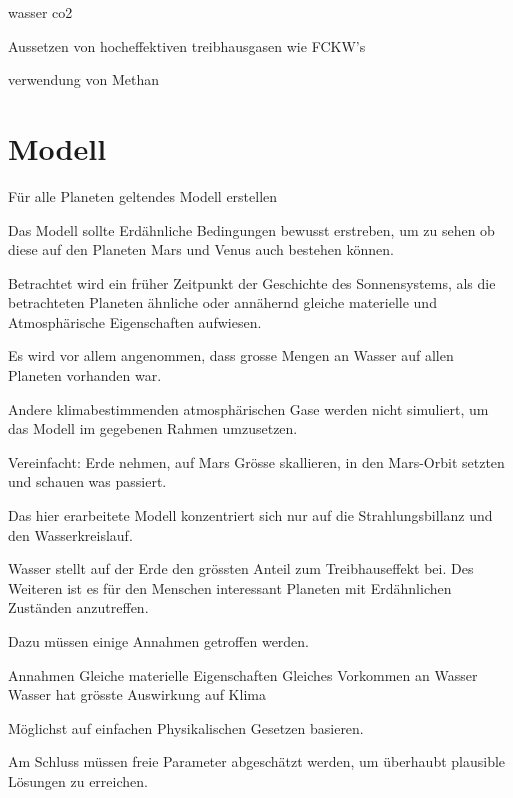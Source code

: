\begin{refsection}
wasser co2



Aussetzen von hocheffektiven treibhausgasen wie FCKW's

verwendung von Methan 




\section{Modell}


	Für alle Planeten geltendes Modell erstellen
	
	Das Modell sollte Erdähnliche Bedingungen bewusst erstreben, um zu sehen ob diese auf den Planeten Mars und Venus auch bestehen können.
	
	Betrachtet wird ein früher Zeitpunkt der Geschichte des Sonnensystems, als die betrachteten Planeten ähnliche oder annähernd gleiche materielle und Atmosphärische Eigenschaften aufwiesen.
	
	Es wird vor allem angenommen, dass grosse Mengen an Wasser auf allen Planeten vorhanden war.
	
	
	Andere klimabestimmenden atmosphärischen Gase werden nicht simuliert, um das Modell im gegebenen Rahmen umzusetzen.

	
	Vereinfacht: Erde nehmen, auf Mars Grösse skallieren, in den Mars-Orbit setzten und schauen was passiert. 
	

Das hier erarbeitete Modell konzentriert sich nur auf die Strahlungsbillanz und den Wasserkreislauf.

Wasser stellt auf der Erde den grössten Anteil zum Treibhauseffekt bei.
Des Weiteren ist es für den Menschen interessant Planeten mit Erdähnlichen Zuständen anzutreffen.



 Dazu müssen einige Annahmen getroffen werden.	
	
	Annahmen
		Gleiche materielle Eigenschaften
		Gleiches Vorkommen an Wasser
		Wasser hat grösste Auswirkung auf Klima
	
	
Möglichst auf einfachen Physikalischen Gesetzen basieren.	
	
	
Am Schluss müssen freie Parameter abgeschätzt werden, um überhaubt plausible Lösungen zu erreichen.



\end{refsection}
